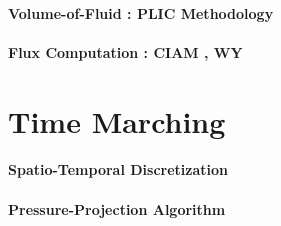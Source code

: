 \paragraph{Volume-of-Fluid : PLIC Methodology}
\blindtext

\paragraph{Flux Computation : CIAM , WY}
\blindtext


\section{Time Marching}

\paragraph{Spatio-Temporal Discretization}
\blindtext

\paragraph{Pressure-Projection Algorithm}
\blindtext


